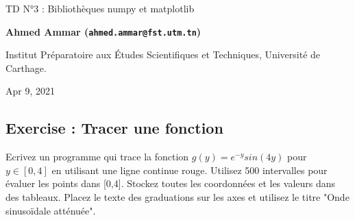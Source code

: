 \documentclass[%
oneside,                 %
final,                   %
10pt,french]{article}
\newenvironment{doconceexercise}{}{}
\newcounter{doconceexercisecounter}
\begin{document}

\newcommand{\exercisesection}[1]{\subsection*{#1}}






\thispagestyle{empty}

\begin{center}
{\LARGE\bf
\begin{spacing}{1.25}
TD N°3 : Bibliothèques numpy et matplotlib
\end{spacing}
}
\end{center}


\begin{center}
{\bf Ahmed Ammar (\texttt{ahmed.ammar@fst.utm.tn})}
\end{center}

    \begin{center}
\centerline{{\small Institut Préparatoire aux Études Scientifiques et Techniques, Université de Carthage.}}
\end{center}
    

\begin{center}
Apr 9, 2021
\end{center}

\vspace{1cm}


\tableofcontents


\vspace{1cm} %






\begin{doconceexercise}

\exercisesection{Exercise \thedoconceexercisecounter: Tracer une fonction}


Ecrivez un programme qui trace la fonction $g(y) = e^{-y} sin(4y)$ pour $y \in [0, 4]$ en utilisant une ligne continue rouge. Utilisez 500 intervalles pour évaluer les points dans [0,4]. Stockez toutes les coordonnées et les valeurs dans des tableaux. Placez le texte des graduations sur les axes et utilisez le titre "Onde sinusoïdale atténuée".



\end{doconceexercise}
\end{document}
